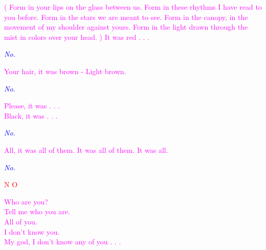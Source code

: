 \documentclass[11pt]{article}
\begin{document}
\begingroup
\begin{center}
\textcolor{magenta}{( Form in your lips on the glass between us. Form in these rhythms I have read to you before. Form in the stars we are meant to see. Form in the canopy, in the movement of my shoulder against yours.  Form in the light drawn through the mist in colors over your head. ) It was red . . .} 
\end{center}
\endgroup

\begingroup
\begin{center}
\textit{\textcolor{blue}{No.}}
\end{center}
\endgroup

\begingroup
\begin{center}
\textcolor{magenta}{Your hair, it was brown - Light brown.} 
\end{center}
\endgroup

\begingroup
\begin{center}
\textit{\textcolor{blue}{No.}}
\end{center}
\endgroup

\begingroup
\begin{center}
\textcolor{magenta}{Please, it was . . . \\ Black, it was . . .} 
\end{center}
\endgroup

\begingroup
\begin{center}
\textit{\textcolor{blue}{No.}}
\end{center}
\endgroup

\begingroup
\begin{center}
\textcolor{magenta}{All, it was all of them. It was all of them. It was all.} 
\end{center}
\endgroup

\begingroup
\begin{center}
\textit{\textcolor{blue}{No.}}
\end{center}
\endgroup

\begingroup
\begin{center}
\textcolor{red}{N O}
\end{center}
\endgroup

\begingroup
\begin{center}
\textcolor{magenta}{Who are you? \\ Tell me who you are. \\ All of you. \\ I don't know you. \\ My god, I don't know any of you . . .} 
\end{center}
\endgroup
\end{document}
